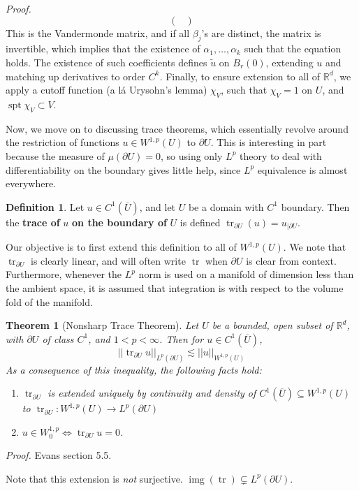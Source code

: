 \documentclass[letterpaper,10pt]{article}
\newcommand{\lsim}{\lesssim}
\DeclareMathOperator{\spt}{spt}
\DeclareMathOperator{\img}{img}
\DeclareMathOperator{\tr}{tr}
\theoremstyle{definition}
\newtheorem{dfn}{Definition}
\theoremstyle{remark}
\theoremstyle{plain}
\newtheorem{thm}{Theorem}[section]
\renewenvironment{proof}{
    \vspace{5pt}
    \begin{mdframed}[bottomline=false,topline=false,rightline=false, skipabove=0]
    \noindent\textit{Proof.}}
{
    \hspace{\fill}\qedsymbol
    \end{mdframed}
}
\begin{document}
\begin{proof}
$$\begin{pmatrix}
    \end{pmatrix}
    $$ %
    This is the Vandermonde matrix, and if all $\beta_j$'s are distinct, the matrix
    is invertible, which implies that the existence of $\alpha_1,\ldots,\alpha_k$
    such that the equation holds.
    The existence of such coefficients defines $\tilde u$ on $B_r(0)$, extending
    $u$ and matching up derivatives to order $C^k$.
    Finally, to ensure extension to all of $\mathbb R^d$, we apply a cutoff function (a l\'a Urysohn's lemma)
    $\chi_V$, such that $\chi_V=1$ on $U$, and $\spt\chi_V\subset V$. %
\end{proof}
Now, we move on to discussing trace theorems, which essentially revolve around 
the restriction of functions $u\in W^{1,p}(U)$ to $\partial U$.
This is interesting in part because the measure of $\mu(\partial U)=0$,
so using only $L^p$ theory to deal with differentiability on the boundary
gives little help, since $L^p$ equivalence is almost everywhere.
\begin{dfn}
    Let $u\in C^1(\overline U)$, and let $U$ be a domain with $C^1$ boundary.
    Then the \textbf{trace of }$u$ \textbf{on the boundary of} $U$ is defined $\tr_{\partial U}(u)=u_{|\partial U}$.
\end{dfn}
Our objective is to first extend this definition to all of $W^{1,p}(U)$.
We note that $\tr_{\partial U}$ is clearly linear, and will 
often write $\tr$ when $\partial U$ is clear from context.
Furthermore, whenever the $L^p$ norm is used on a manifold of dimension less
than the ambient space, it is assumed that integration is with respect to the 
volume fold of the manifold.
\begin{thm}[Nonsharp Trace Theorem]\label{thm:nonsharptr}
    Let $U$ be a bounded, open subset of $\mathbb R^d$, with $\partial U$ of class
    $C^1$, and $1<p<\infty$.
    Then for $u\in C^1(\overline U)$,
    $$
        ||\tr_{\partial U}u||_{L^p(\partial U)}\lsim||u||_{W^{1,p}(U)}
    $$
    As a consequence of this inequality, the following facts hold:
    \begin{enumerate}[label=\roman*.]
        \item $\tr_{\partial U}$ is extended uniquely by continuity and density
            of $C^1(\overline U)\subseteq W^{1,p}(U)$ to 
            $
            \tr_{\partial U}:W^{1,p}(U)\rightarrow L^p(\partial U)
            $
        \item $u\in W_0^{1,p}\Leftrightarrow\tr_{\partial U}u=0$.
    \end{enumerate}
\end{thm}
\begin{proof}
    Evans section 5.5. %
\end{proof}
Note that this extension is \emph{not} surjective. $\img(\tr)\subsetneq L^p(\partial U)$.
\end{document}
